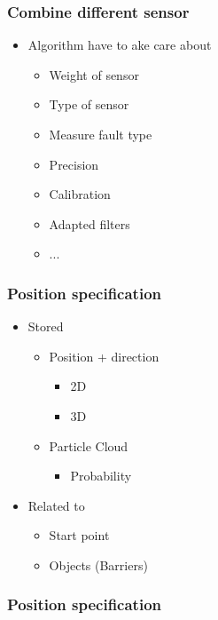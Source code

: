 \frame
{
\frametitle{Combine different sensor}

\begin{itemize}
\item Algorithm have to ake care about
	\begin{itemize}
	\item Weight of sensor
	\item Type of sensor
	\item Measure fault type
	\item Precision
	\item Calibration
	\item Adapted filters
	\item ...
	\end{itemize}
\end{itemize}
}


\frame
{
\frametitle{Position specification}

\begin{itemize}
\item Stored
	\begin{itemize}
	\item Position + direction
		\begin{itemize}
		\item 2D
		\item 3D
		\end{itemize}
	\item Particle Cloud
		\begin{itemize}
		\item Probability
		\end{itemize}
	\end{itemize}
\item Related to
	\begin{itemize}
	\item Start point
	\item Objects (Barriers)
	\end{itemize}
\end{itemize}
}


\frame
{
\frametitle{Position specification}

}
